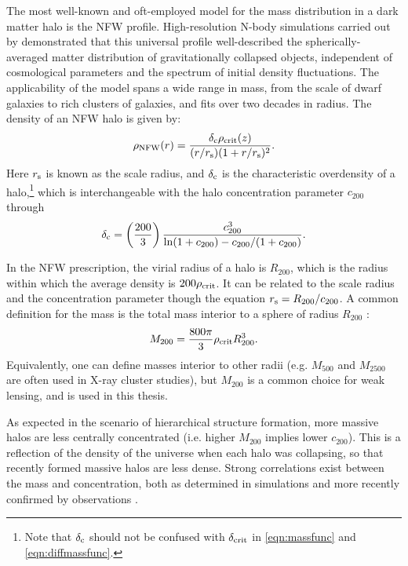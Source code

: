 The most well-known and oft-employed model for the mass distribution in a dark matter halo is the \ac{NFW} profile. High-resolution N-body simulations carried out by \citet{nfw96} demonstrated that this universal profile well-described the spherically-averaged matter distribution of gravitationally collapsed objects, independent of cosmological parameters and the spectrum of initial density fluctuations. The applicability of the model spans a wide range in mass, from the scale of dwarf galaxies to rich clusters of galaxies, and fits over two decades in radius. The density of an \ac{NFW} halo is given by:
\begin{equation}
\rho_{\mathrm{NFW}}(r) = \frac{\delta_{\rm c} \rho_{\mathrm{crit}}(z)}{(r/r_{\rm s})(1+r/r_{\rm s})^2}.
\end{equation}
Here $r_{\rm s}$ is known as the scale radius, and $\delta_{\rm c}$ is the characteristic overdensity of a halo,\footnote{Note that $\delta_{\rm c}$ should not be confused with $\delta_{\rm crit}$ in \autoref{eqn:massfunc} and \autoref{eqn:diffmassfunc}.} which is interchangeable with the halo concentration parameter $c_{200}$ through
\begin{equation}
\delta_{\rm c} = \left( \frac{200}{3} \right) \frac{c_{200}^3}{{\rm ln}(1+c_{200}) - c_{200}/(1+c_{200})}.
\end{equation}

In the \ac{NFW} prescription, the virial radius of a halo is $R_{200}$, which is the radius within which the average density is $200\rho_{\rm crit}$. It can be related to the scale radius and the concentration parameter though the equation $r_{\rm s} = R_{200}/c_{200}$. A common definition for the mass is the total mass interior to a sphere of radius $R_{200}$ \citep{Wright00}:
\begin{equation}
M_{200} = \frac{800 \pi}{3} \rho_{\rm crit} R_{200}^3.
\end{equation}
Equivalently, one can define masses interior to other radii (e.g. $M_{500}$ and $M_{2500}$ are often used in X-ray cluster studies), but $M_{200}$ is a common choice for weak lensing, and is used in this thesis.

As expected in the scenario of hierarchical structure formation, more massive halos are less centrally concentrated (i.e. higher $M_{200}$ implies lower $c_{200}$). This is a reflection of the density of the universe when each halo was collapsing, so that recently formed massive halos are less dense. Strong correlations exist between the mass and concentration, both as determined in simulations \citep{Duffy08,Prada12,Dutton14} and more recently confirmed by observations \citep{Okabe13,Merten14}. 

